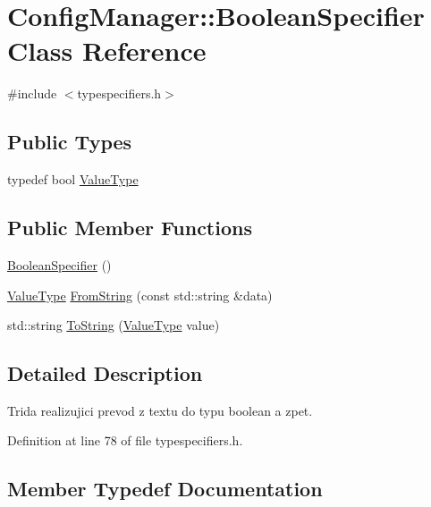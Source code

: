 \hypertarget{class_config_manager_1_1_boolean_specifier}{}\section{Config\+Manager\+:\+:Boolean\+Specifier Class Reference}
\label{class_config_manager_1_1_boolean_specifier}


{\ttfamily \#include $<$typespecifiers.\+h$>$}

\subsection*{Public Types}
\begin{DoxyCompactItemize}
\item 
typedef bool \hyperlink{class_config_manager_1_1_boolean_specifier_a765f3a2d8461a647ba1a84434665b54b}{Value\+Type}
\end{DoxyCompactItemize}
\subsection*{Public Member Functions}
\begin{DoxyCompactItemize}
\item 
\hyperlink{class_config_manager_1_1_boolean_specifier_ab8c8434a5de2cccb032cb6c7fbf3ae1c}{Boolean\+Specifier} ()
\item 
\hyperlink{class_config_manager_1_1_boolean_specifier_a765f3a2d8461a647ba1a84434665b54b}{Value\+Type} \hyperlink{class_config_manager_1_1_boolean_specifier_aa2964b687c6614053a9441b8f16eadcd}{From\+String} (const std\+::string \&data)
\item 
std\+::string \hyperlink{class_config_manager_1_1_boolean_specifier_a79947088ce64f51e90b42fc27587e503}{To\+String} (\hyperlink{class_config_manager_1_1_boolean_specifier_a765f3a2d8461a647ba1a84434665b54b}{Value\+Type} value)
\end{DoxyCompactItemize}


\subsection{Detailed Description}
Trida realizujici prevod z textu do typu boolean a zpet. 

Definition at line 78 of file typespecifiers.\+h.



\subsection{Member Typedef Documentation}
